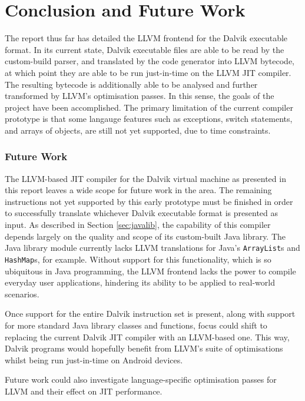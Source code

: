 \chapter{Conclusion and Future Work}
\label{chap:conclusion}

The report thus far has detailed the LLVM frontend for the Dalvik executable format. In its current state, Dalvik executable files are able to be read by the custom-build parser, and translated by the code generator into LLVM bytecode, at which point they are able to be run just-in-time on the LLVM JIT compiler. The resulting bytecode is additionally able to be analysed and further transformed by LLVM's optimisation passes. In this sense, the goals of the project have been accomplished. The primary limitation of the current compiler prototype is that some langauge features such as exceptions, switch statements, and arrays of objects, are still not yet supported, due to time constraints.

\subsection*{Future Work}

The LLVM-based JIT compiler for the Dalvik virtual machine as presented in this report leaves a wide scope for future work in the area. The remaining instructions not yet supported by this early prototype must be finished in order to successfully translate whichever Dalvik executable format is presented as input. As described in Section \ref{sec:javalib}, the capability of this compiler depends largely on the quality and scope of its custom-built Java library. The Java library module currently lacks LLVM translations for Java's \verb|ArrayList|s and \verb|HashMap|s, for example. Without support for this functionality, which is so ubiquitous in Java programming, the LLVM frontend lacks the power to compile everyday user applications, hindering its ability to be applied to real-world scenarios.

Once support for the entire Dalvik instruction set is present, along with support for more standard Java library classes and functions, focus could shift to replacing the current Dalvik JIT compiler with an LLVM-based one. This way, Dalvik programs would hopefully benefit from LLVM's suite of optimisations whilst being run just-in-time on Android devices.

Future work could also investigate language-specific optimisation passes for LLVM and their effect on JIT performance.
